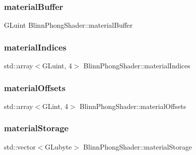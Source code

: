 \subsubsection{\texorpdfstring{material\+Buffer}{materialBuffer}}
{\footnotesize\ttfamily G\+Luint Blinn\+Phong\+Shader\+::material\+Buffer\hspace{0.3cm}{\ttfamily [protected]}}

\hypertarget{class_blinn_phong_shader_a2b14622a5d0f8ca32c05cc387700692a}{}\label{class_blinn_phong_shader_a2b14622a5d0f8ca32c05cc387700692a} 
\subsubsection{\texorpdfstring{material\+Indices}{materialIndices}}
{\footnotesize\ttfamily std\+::array$<$G\+Luint, 4$>$ Blinn\+Phong\+Shader\+::material\+Indices\hspace{0.3cm}{\ttfamily [protected]}}

\hypertarget{class_blinn_phong_shader_a145f22608d6e32a4ec5df39388ad0530}{}\label{class_blinn_phong_shader_a145f22608d6e32a4ec5df39388ad0530} 
\subsubsection{\texorpdfstring{material\+Offsets}{materialOffsets}}
{\footnotesize\ttfamily std\+::array$<$G\+Lint, 4$>$ Blinn\+Phong\+Shader\+::material\+Offsets\hspace{0.3cm}{\ttfamily [protected]}}

\hypertarget{class_blinn_phong_shader_a7c9644732d35c788d1c94f44b7783d83}{}\label{class_blinn_phong_shader_a7c9644732d35c788d1c94f44b7783d83} 
\subsubsection{\texorpdfstring{material\+Storage}{materialStorage}}
{\footnotesize\ttfamily std\+::vector$<$G\+Lubyte$>$ Blinn\+Phong\+Shader\+::material\+Storage\hspace{0.3cm}{\ttfamily [protected]}}

